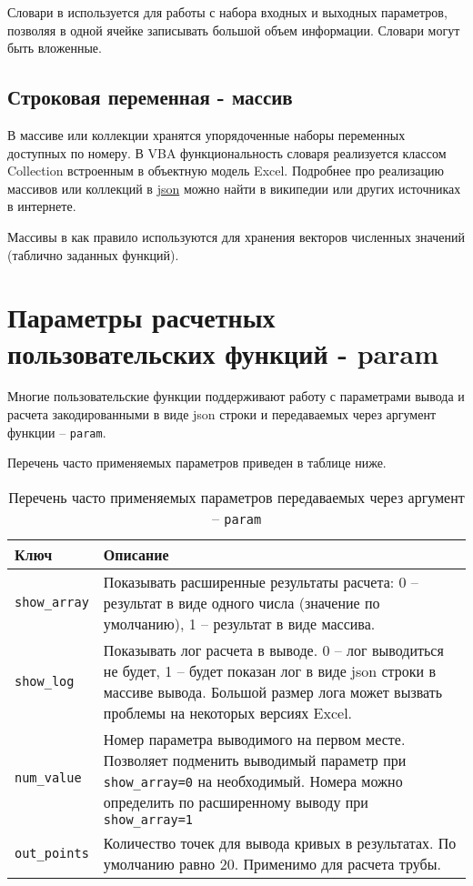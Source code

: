 Словари в \unf{} используется для работы с набора входных и выходных параметров, позволяя в одной ячейке записывать большой объем информации. Словари могут быть вложенные.

\subsection{Строковая переменная - массив}
В массиве или коллекции хранятся упорядоченные наборы переменных доступных по номеру. В VBA функциональность словаря реализуется классом Collection встроенным в объектную модель Excel. Подробнее про реализацию массивов или коллекций в \href{https://ru.wikipedia.org/wiki/JSON}{json} можно найти в википедии или других источниках в интернете.

Массивы в \unf{} как правило используются для хранения векторов численных значений (таблично заданных функций).

\section{Параметры расчетных пользовательских функций - param}

Многие пользовательские функции \unf{} поддерживают работу с параметрами вывода и расчета закодированными в виде json строки и передаваемых через аргумент функции -- \texttt{param}.

Перечень часто применяемых параметров приведен в таблице ниже.

\begin{table}[H]
	\caption{Перечень часто применяемых параметров передаваемых через аргумент -- \texttt{param}}
	\label{table:param_list}
	\begin{tabular}{p{}p{}}
		\hline
		Ключ & Описание  \\ \hline
		\texttt{show_array} & Показывать расширенные результаты расчета: 0 -- результат в виде одного числа (значение по умолчанию), 1 -- результат в виде массива.    \\ \hline
		
		\texttt{show_log} & Показывать лог расчета в выводе. 0 -- лог выводиться не будет, 1 -- будет показан лог в виде json строки в массиве вывода. Большой размер лога может вызвать проблемы на некоторых версиях Excel.   \\ \hline
		
		\texttt{num_value} & Номер параметра выводимого на первом месте. Позволяет подменить выводимый параметр при \texttt{show_array=0} на необходимый. Номера можно определить по расширенному выводу при \texttt{show_array=1}  \\ \hline
		
		\texttt{out_points} & Количество точек для вывода кривых в результатах. По умолчанию равно 20. Применимо для расчета трубы.  \\ \hline
	\end{tabular}
\end{table}

